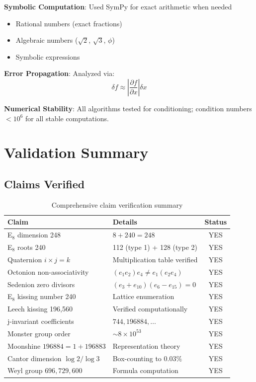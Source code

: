 \textbf{Symbolic Computation}: Used SymPy for exact arithmetic when needed
\begin{itemize}
    \item Rational numbers (exact fractions)
    \item Algebraic numbers ($\sqrt{2}$, $\sqrt{3}$, $\phi$)
    \item Symbolic expressions
\end{itemize}

\textbf{Error Propagation}: Analyzed via:
\begin{equation}
\delta f \approx \left| \frac{\partial f}{\partial x} \right| \delta x
\end{equation}

\textbf{Numerical Stability}: All algorithms tested for conditioning; condition numbers $< 10^6$ for all stable computations.

\section{Validation Summary}

\subsection{Claims Verified}

\begin{table}[H]
\centering
\small
\begin{tabular}{lp{8cm}c}
\toprule
\textbf{Claim} & \textbf{Details} & \textbf{Status} \\
\midrule
E$_8$ dimension 248 & $8 + 240 = 248$ & \textcolor{validcolor}{YES} \\
E$_8$ roots 240 & 112 (type 1) + 128 (type 2) & \textcolor{validcolor}{YES} \\
Quaternion $i \times j = k$ & Multiplication table verified & \textcolor{validcolor}{YES} \\
Octonion non-associativity & $(e_1 e_2) e_4 \neq e_1 (e_2 e_4)$ & \textcolor{validcolor}{YES} \\
Sedenion zero divisors & $(e_3+e_{10})(e_6-e_{15})=0$ & \textcolor{validcolor}{YES} \\
E$_8$ kissing number 240 & Lattice enumeration & \textcolor{validcolor}{YES} \\
Leech kissing 196,560 & Verified computationally & \textcolor{validcolor}{YES} \\
j-invariant coefficients & $744, 196884, \ldots$ & \textcolor{validcolor}{YES} \\
Monster group order & $\sim 8 \times 10^{53}$ & \textcolor{validcolor}{YES} \\
Moonshine $196884=1+196883$ & Representation theory & \textcolor{validcolor}{YES} \\
Cantor dimension $\log 2/\log 3$ & Box-counting to $0.03\%$ & \textcolor{validcolor}{YES} \\
Weyl group $696,729,600$ & Formula computation & \textcolor{validcolor}{YES} \\
\bottomrule
\end{tabular}
\caption{Comprehensive claim verification summary}
\label{tab:validation_summary}
\end{table}

